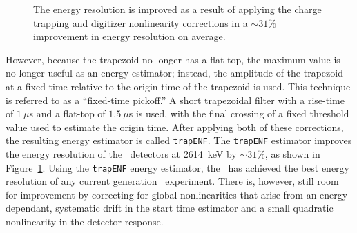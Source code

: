 \documentclass[/main.tex]{subfiles}
\begin{document}
\begin{figure}
  \centering
  \caption[Improvement in energy resolution from charge trapping correction]{\label{fig:trapenf}
    The energy resolution is improved as a result of applying the charge trapping and digitizer nonlinearity corrections in a ${\sim}31\%$ improvement in energy resolution on average.
  }
\end{figure}
However, because the trapezoid no longer has a flat top, the maximum value is no longer useful as an energy estimator; instead, the amplitude of the trapezoid at a fixed time relative to the origin time of the trapezoid is used.
This technique is referred to as a ``fixed-time pickoff.''
A short trapezoidal filter with a rise-time of $1~\mu$s and a flat-top of $1.5~\mu$s is used, with the final crossing of a fixed threshold value used to estimate the origin time.
After applying both of these corrections, the resulting energy estimator is called \texttt{trapENF}.
The \texttt{trapENF} estimator improves the energy resolution of the \MJD\ detectors at 2614~keV by ${\sim}31\%$, as shown in Figure~\ref{fig:trapenf}.
Using the \texttt{trapENF} energy estimator, the \MJD\ has achieved the best energy resolution of any current generation \znbb\ experiment.
There is, however, still room for improvement by correcting for global nonlinearities that arise from an energy dependant, systematic drift in the start time estimator and a small quadratic nonlinearity in the detector response.
\end{document}
